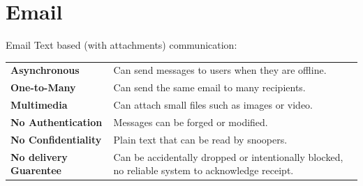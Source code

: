 \section{Email}
\begin{definitionbox}{Email}
    Text based (with attachments) communication:
    \begin{tabular}{l p{}}
        \textbf{Asynchronous}          & Can send messages to users when they are offline.                                                \\
        \textbf{One-to-Many}           & Can send the same email to many recipients.                                                      \\
        \textbf{Multimedia}            & Can attach small files such as images or video.                                                  \\
        \textbf{No Authentication}     & Messages can be forged or modified.                                                              \\
        \textbf{No Confidentiality}    & Plain text that can be read by snoopers.                                                         \\
        \textbf{No delivery Guarentee} & Can be accidentally dropped or intentionally blocked, no reliable system to acknowledge receipt. \\
    \end{tabular}
\end{definitionbox}

